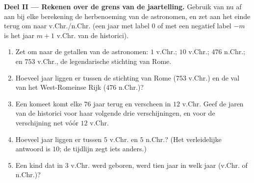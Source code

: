 \begin{problem}
\medskip
\noindent\textbf{Deel II --- Rekenen over de grens van de jaartelling.}
Gebruik van nu af aan bij elke berekening de herbenoeming van de astronomen, en
zet aan het einde terug om naar v.Chr./n.Chr. (een jaar met label $0$ of met een
negatief label $-m$ is het jaar $m + 1$ v.Chr. van de historici).
\begin{enumerate}[resume]
  \item Zet om naar de getallen van de astronomen: $1$ v.Chr.; $10$ v.Chr.; $476$
        n.Chr.; en $753$ v.Chr., de legendarische stichting van Rome.
  \item Hoeveel jaar liggen er tussen de stichting van Rome ($753$ v.Chr.) en de
        val van het West-Romeinse Rijk ($476$ n.Chr.)?
  \item Een komeet komt elke $76$ jaar terug en verscheen in $12$ v.Chr. Geef de
        jaren van de historici voor haar volgende drie verschijningen, en voor de
        verschijning net vóór $12$ v.Chr.
  \item Hoeveel jaar liggen er tussen $5$ v.Chr. en $5$ n.Chr.? (Het verleidelijke
        antwoord is $10$; de tijdlijn zegt iets anders.)
  \item Een kind dat in $3$ v.Chr. werd geboren, werd tien jaar in welk jaar
        (v.Chr. of n.Chr.)?
\end{enumerate}


\end{problem}
